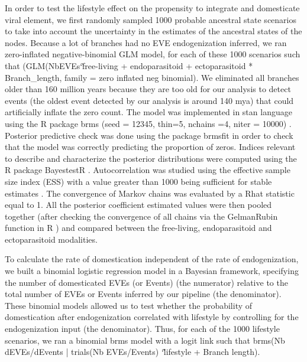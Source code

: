 In order to test the lifestyle effect on the propensity to integrate and domesticate viral element, we first randomly sampled 1000 probable ancestral state scenarios to take into account the uncertainty in the estimates of the ancestral states of the nodes. Because a lot of branches had no EVE endogenization inferred, we ran zero-inflated negative-binomial GLM model, for each of these 1000 scenarios such that (GLM(NbEVEs\char`\~ free-living + endoparasitoid + ectoparasitoid * Branch\_length, family = zero inflated neg binomial). We eliminated all branches older than 160 million years because they are too old for our analysis to detect events (the oldest event detected by our analysis is around 140 mya) that could artificially inflate the zero count. The model was implemented in stan language using the R package brms (seed = 12345, thin=5, nchains =4, niter = 10000) \citep{burkner_brms_2017,burkner_advanced_2018}. Posterior predictive check was done using the package brmsfit in order to check that the model was correctly predicting the proportion of zeros.  Indices relevant to describe and characterize the posterior distributions were computed using the R package BayestestR \citep{makowski_bayestestr_2019}. Autocorrelation was studied using the effective sample size index (ESS) with a value greater than 1000 being sufficient for stable estimates \citep{burkner_brms_2017}. The convergence of Markov chains was evaluated by a Rhat statistic equal to 1. All the posterior coefficient estimated values were then pooled together (after checking the convergence of all chains via the GelmanRubin function in R \citep{bolstad_understanding_2010}) and compared between the free-living, endoparasitoid and ectoparasitoid modalities.  

To calculate the rate of domestication independent of the rate of endogenization, we built a binomial logistic regression model in a Bayesian framework, specifying the number of domesticated EVEs (or Events) (the numerator) relative to the total number of EVEs or Events inferred by our pipeline (the denominator). These binomial models allowed us to test whether the probability of domestication after endogenization correlated with lifestyle by controlling for the endogenization input (the denominator). Thus, for each of the 1000 lifestyle scenarios, we ran a binomial brms model with a logit link such that brms(Nb dEVEs/dEvents | trials(Nb EVEs/Events) \char`\~ lifestyle + Branch length).

